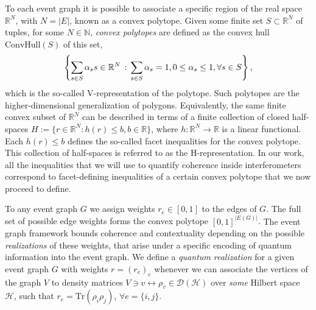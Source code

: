 \documentclass[letterpaper,onecolumn,12pt,accepted=2024-01-17]{article}
\begin{document}
{ To each event graph it is possible to associate a specific region of the real space $\mathbb{R}^N$, with $N=|E|$, known as a convex polytope. Given some finite set $S\subset \mathbb{R}^N$ of tuples, for some $N \in \mathbb{N}$, \textit{convex polytopes} are defined as the convex hull $\text{ConvHull}(S)$ of this set, $$\left\{\sum_{s \in S}\alpha_s s \in \mathbb{R}^N \, : \, \sum_{s \in S}\alpha_s = 1, \\ 0 \leq \alpha_s \leq 1, \forall s \in S\right\},$$ which is the so-called V-representation of the polytope. Such polytopes are the higher-dimensional generalization of polygons. Equivalently, the same finite convex subset of $\mathbb{R}^N$ can be described in terms of a finite collection of  closed half-spaces $H := \{r \in \mathbb{R}^N: h(r) \leq b, b \in \mathbb{R}\}$, where $h:\mathbb{R}^N \to \mathbb{R}$ is a linear functional. Each $h(r) \leq b$ defines the so-called facet inequalities for the convex polytope. This collection of half-spaces is referred to as the H-representation. In our work, all the inequalities that we will use to quantify coherence inside interferometers correspond to facet-defining inequalities of a certain convex polytope that we now proceed to define. }

To any event graph $G$ we assign weights $r_e \in [0,1]$ to the edges of $G$. The full set of possible edge {weights} forms the  convex polytope $[0,1]^{|E(G)|}$. {The event graph framework bounds coherence and contextuality depending on the possible \textit{realizations} of these weights, that arise under a specific encoding of quantum information into the event graph. We define a \textit{quantum realization} for a given event graph $G$ with weights $r=(r_e)_e$ whenever we can associate the vertices of the graph $V$ to density matrices $V \ni v \leftrightarrow \rho_v \in \mathcal{D}(\mathcal{H})$ over \textit{some} Hilbert space $\mathcal{H}$, such that $r_{e} = \text{Tr}(\rho_i\rho_j)$,  $\forall e=\{i,j\}$. } 
\end{document}
